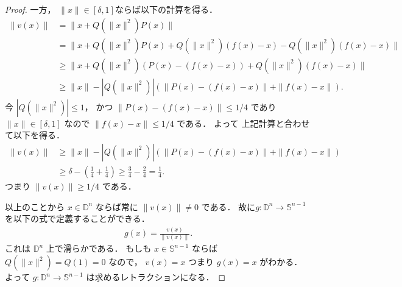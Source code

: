\documentclass[leqno, a4paper, 12pt]{jsarticle}
\theoremstyle{plain}
\theoremstyle{definition}
\theoremstyle{remark}
\newcommand{\yospfont}[1]{\mathbb{#1}}
\newcommand{\yodisc}[1]{\yospfont{D}^{#1}}
\newcommand{\yosphere}[1]{\yospfont{S}^{#1}}
\numberwithin{equation}{section}
\begin{document}
\begin{proof}
一方，
$\|x\|\in[\delta,1]$ならば以下の計算を得る．
\begin{align*}
\|v(x)\|&=\|x+Q(\|x\|^2)P(x)\|\\
&=\|x+Q(\|x\|^2)P(x)+Q(\|x\|^2)(f(x)-x)-Q(\|x\|^2)(f(x)-x)\|\\
&\ge \|x+Q(\|x\|^2)(P(x)-(f(x)-x))+Q(\|x\|^2)(f(x)-x)\|\\
&\ge \|x\|-|Q(\|x\|^2)|(\|P(x)-(f(x)-x)\|+\|f(x)-x\|). 
\end{align*}
今
$|Q(\|x\|^2)|\le 1$，
かつ
$\|P(x)-(f(x)-x)\|\le 1/4$
であり
$\|x\|\in[\delta,1]$
なので
$\|f(x)-x\|\le 1/4$
である．
よって
上記計算と合わせて以下を得る．
\begin{align*}
\|v(x)\|&\ge \|x\|-|Q(\|x\|^2)|(\|P(x)-(f(x)-x)\|+\|f(x)-x\|)\\
&\ge \delta-\left(\frac{1}{4}+\frac{1}{4}\right)\ge \frac{3}{4}-\frac{2}{4}=\frac{1}{4}. 
\end{align*}
つまり
$\|v(x)\|\ge 1/4$
である．

以上のことから
$x\in \yodisc{n}$
ならば常に
$\|v(x)\|\neq 0$
である．
故に$g\colon \yodisc{n}\to \yosphere{n-1}$
を以下の式で定義することができる．
\begin{align}
g(x)=\frac{v(x)}{\|v(x)\|}. 
\end{align}
これは
$\yodisc{n}$
上で滑らかである．
もしも
$x\in \yosphere{n-1}$
ならば
$Q(\|x\|^2)=Q(1)=0$
なので，
$v(x)=x$
つまり
$g(x)=x$
がわかる．
よって
$g\colon \yodisc{n}\to \yosphere{n-1}$
は求めるレトラクションになる．
\end{proof}
\end{document}
